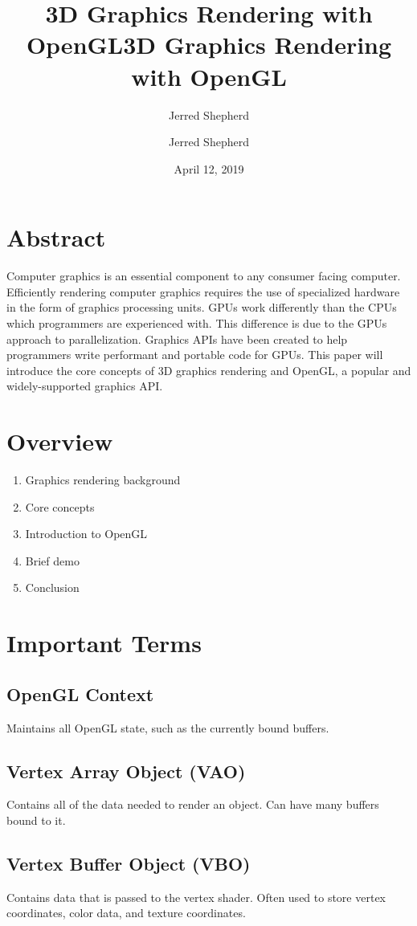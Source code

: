 \documentclass{article}
\title{\Large\textbf{3D Graphics Rendering with OpenGL}}
\author{Jerred Shepherd}
\begin{document}
  \title{3D Graphics Rendering with OpenGL}
  \author{Jerred Shepherd}
  \date{April 12, 2019}
  \maketitle
  
  \section{Abstract}
  Computer graphics is an essential component to any consumer facing computer. Efficiently rendering computer graphics requires the use of specialized hardware in the form of graphics processing units. GPUs work differently than the CPUs which programmers are experienced with. This difference is due to the GPUs approach to parallelization. Graphics APIs have been created to help programmers write performant and portable code for GPUs. This paper will introduce the core concepts of 3D graphics rendering and OpenGL, a popular and widely-supported graphics API.
  
  \section{Overview}
  \begin{enumerate}
    \item Graphics rendering background
    \item Core concepts
    \item Introduction to OpenGL
    \item Brief demo
    \item Conclusion
  \end{enumerate}
  
  \section{Important Terms}
  \subsection{OpenGL Context}
  Maintains all OpenGL state, such as the currently bound buffers.
  \subsection{Vertex Array Object (VAO)}
  Contains all of the data needed to render an object. Can have many buffers bound to it.
  \subsection{Vertex Buffer Object (VBO)}
  Contains data that is passed to the vertex shader. Often used to store vertex coordinates, color data, and texture coordinates.
\end{document}
